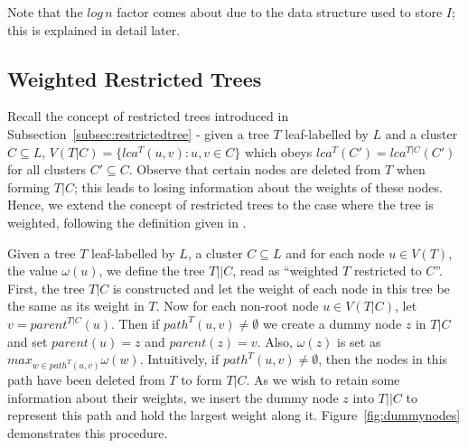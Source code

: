 \documentclass{article}
\newcommand{\weight}{\omega}
\begin{document}
    Note that the $log\,n$ factor comes about due to the data structure used to store $I$; this is explained in detail later.

    \subsection{Weighted Restricted Trees}
    \label{subsec:restrictedweighted}

    Recall the concept of restricted trees introduced in Subsection~\ref{subsec:restrictedtree} - given a tree $T$ leaf-labelled by $L$ and a cluster $C \subseteq L$, $V(T|C) = \{lca^T(u, v) : u, v \in C\}$ which obeys $lca^T(C') = lca^{T|C}(C')$ for all clusters $C' \subseteq C$. Observe that certain nodes are deleted from $T$ when forming $T|C$; this leads to losing information about the weights of these nodes. Hence, we extend the concept of restricted trees to the case where the tree is weighted, following the definition given in \cite{jansson2018algorithms}.

    Given a tree $T$ leaf-labelled by $L$, a cluster $C \subseteq L$ and for each node $u \in V(T)$, the value $\weight(u)$, we define the tree $T||C$, read as ``weighted $T$ restricted to $C$''. First, the tree $T|C$ is constructed and let the weight of each node in this tree be the same as its weight in $T$. Now for each non-root node $u \in V(T|C)$, let $v = parent^{T|C}(u)$. Then if $path^{T}(u, v) \neq \emptyset$ we create a dummy node $z$ in $T|C$ and set $parent(u) = z$ and $parent(z) = v$. Also, $\weight(z)$ is set as $max_{w \in path^{T}(u, v)} \weight(w)$. Intuitively, if $path^{T}(u, v) \neq \emptyset$, then the nodes in this path have been deleted from $T$ to form $T|C$. As we wish to retain some information about their weights, we insert the dummy node $z$ into $T||C$ to represent this path and hold the largest weight along it. Figure~\ref{fig:dummynodes} demonstrates this procedure.
\end{document}
